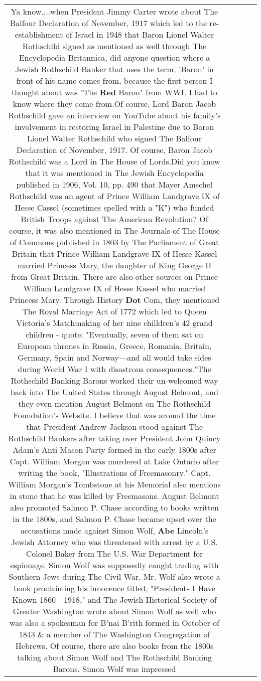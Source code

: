 \documentclass[11pt]{article}
\newlength\mylength
\begin{document}
\begin{center}
\begin{longtable}{|C{.65\mylength}|C{.30\mylength}|C{.12\mylength}|C{.12\mylength}|C{.12\mylength}|}
  \small Ya know....when President Jimmy Carter wrote about The Balfour Declaration of November, 1917 which led to the re-establishment of Israel in 1948 that Baron Lionel Walter Rothschild signed as mentioned as well through The Encyclopedia Britannica, did anyone question where a Jewish Rothschild Banker that uses the term, 'Baron' in front of his name comes from, because the first person I thought about was "The \textbf{R\textbf{ed}} Baron" from WWI. I had to know where they come from.Of course, Lord Baron Jacob Rothschild gave an interview on YouTube about his family's involvement in restoring Israel in Palestine due to Baron Lionel Walter Rothschild who signed The Balfour Declaration of November, 1917. Of course, Baron Jacob Rothschild was a Lord in The House of Lords.Did you know that it was mentioned in The Jewish Encyclopedia published in 1906, Vol. 10, pp. 490 that Mayer Amschel Rothschild was an agent of Prince William Landgrave IX of Hesse Cassel (sometimes spelled with a "K") who funded British Troops against The American Revolution? Of course, it was also mentioned in The Journals of The House of Commons published in 1803 by The Parliament of Great Britain that Prince William Landgrave IX of Hesse Kassel married Princess Mary, the daughter of King George II from Great Britain. There are also other sources on Prince William Landgrave IX of Hesse Kassel who married Princess Mary. Through History \textbf{Dot} Com, they mentioned The Royal Marriage Act of 1772 which led to Queen Victoria's Matchmaking of her nine chilldren's 42 grand children - quote: "Eventually, seven of them sat on European thrones in Russia, Greece, Romania, Britain, Germany, Spain and Norway—and all would take sides during World War I with disastrous consequences."The Rothschild Banking Barons worked their un-welcomed way back into The United States through August Belmont, and they even mention August Belmont on The Rothschild Foundation's Website. I believe that was around the time that President Andrew Jackson stood against The Rothschild Bankers after taking over President John Quincy Adam's Anti Mason Party formed in the early 1800s after Capt. William Morgan was murdered at Lake Ontario after writing the book, "Illustrations of Freemasonry." Capt. William Morgan's Tombstone at his Memorial also mentions in stone that he was killed by Freemasons. August Belmont also promoted Salmon P. Chase according to books written in the 1800s, and Salmon P. Chase became upset over the accusations made against Simon Wolf, \textbf{Abe} Lincoln's Jewish Attorney who was threatened with arrest by a U.S. Colonel Baker from The U.S. War Department for espionage. Simon Wolf was supposedly caught trading with Southern Jews during The Civil War. Mr. Wolf also wrote a book proclaiming his innocence titled, "Presidents I Have Known 1860 - 1918," and The Jewish Historical Society of Greater Washington wrote about Simon Wolf as well who was also a spokesman for B'nai B'rith formed in October of 1843 \& a member of The Washington Congregation of Hebrews. Of course, there are also books from the 1800s talking about Simon Wolf and The Rothschild Banking Barons. Simon Wolf was impressed 
\end{longtable}
\end{center}
\end{document}
